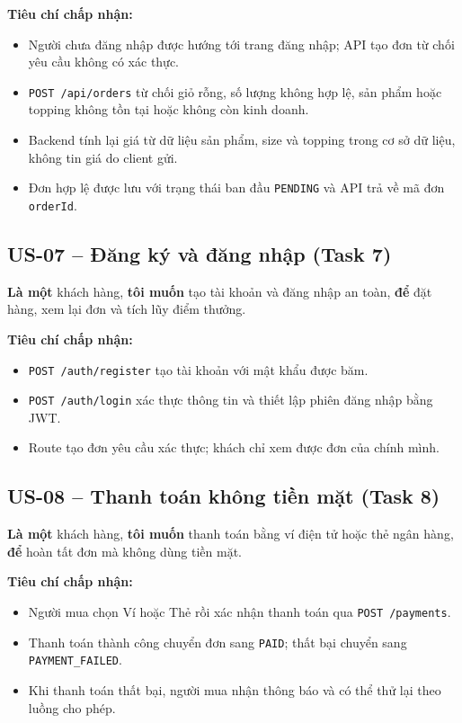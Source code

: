 \textbf{Tiêu chí chấp nhận:}
\begin{itemize}
  \item Người chưa đăng nhập được hướng tới trang đăng nhập; API tạo đơn từ chối yêu cầu không có xác thực.
  \item \texttt{POST /api/orders} từ chối giỏ rỗng, số lượng không hợp lệ, sản phẩm hoặc topping không tồn tại hoặc không còn kinh doanh.
  \item Backend tính lại giá từ dữ liệu sản phẩm, size và topping trong cơ sở dữ liệu, không tin giá do client gửi.
  \item Đơn hợp lệ được lưu với trạng thái ban đầu \texttt{PENDING} và API trả về mã đơn \texttt{orderId}.
\end{itemize}

\subsection*{US-07 -- Đăng ký và đăng nhập (Task 7)}
\textbf{Là một} khách hàng, \textbf{tôi muốn} tạo tài khoản và đăng nhập an toàn, \textbf{để} đặt hàng, xem lại đơn và tích lũy điểm thưởng.

\textbf{Tiêu chí chấp nhận:}
\begin{itemize}
  \item \texttt{POST /auth/register} tạo tài khoản với mật khẩu được băm.
  \item \texttt{POST /auth/login} xác thực thông tin và thiết lập phiên đăng nhập bằng JWT.
  \item Route tạo đơn yêu cầu xác thực; khách chỉ xem được đơn của chính mình.
\end{itemize}

\subsection*{US-08 -- Thanh toán không tiền mặt (Task 8)}
\textbf{Là một} khách hàng, \textbf{tôi muốn} thanh toán bằng ví điện tử hoặc thẻ ngân hàng, \textbf{để} hoàn tất đơn mà không dùng tiền mặt.

\textbf{Tiêu chí chấp nhận:}
\begin{itemize}
  \item Người mua chọn Ví hoặc Thẻ rồi xác nhận thanh toán qua \texttt{POST /payments}.
  \item Thanh toán thành công chuyển đơn sang \texttt{PAID}; thất bại chuyển sang \texttt{PAYMENT\_FAILED}.
  \item Khi thanh toán thất bại, người mua nhận thông báo và có thể thử lại theo luồng cho phép.
\end{itemize}

